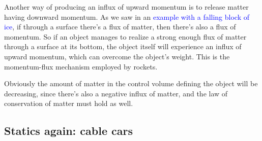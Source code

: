 \documentclass[a4paper,12pt,%
onecolumn,oneside,titlepage,%
british%
]{memoir}
\renewcommand*{\bm}[1]{\textpdfrender{TextRenderingMode=2,LineWidth=0.3pt}{\boldsymbol{#1}}}
\renewcommand*{\|}[1][]{\nonscript\:#1\vert\nonscript\:\mathopen{}}
\newcommand*{\sect}{\S}%
\renewcommand*{\autoref}[2]{\sidepar{\vspace{-1ex}\footnotesize{\color{blue}\faIcon{%
angle-right%
}\enspace\sect\,\ref{#1} page\,\pageref{#1}}}\textcolor{blue}{#2}}
\newcommand*{\yvs}{\bm{v}_{\text{s}}}
\newcommand*{\yJ}{J}
\newcommand*{\yrho}{\rho}
\begin{document}
Another way of producing an influx of upward momentum is to release matter having downward momentum. As we saw in an \autoref{sec:example_balance_static}{example with a falling block of ice}, if through a surface there's a flux of matter, then there's also a flux of momentum. So if an object manages to realize a strong enough flux of matter through a surface at its bottom, the object itself will experience an influx of upward momentum, which can overcome the object's weight. This is the momentum-flux mechanism employed by rockets.

Obviously the amount of matter in the control volume defining the object will be decreasing, since there's also a negative influx of matter, and the law of conservation of matter must hold as well.

%



\subsection{Statics again: cable cars}
\label{sec:bal_momentum_cablecar}
\end{document}

